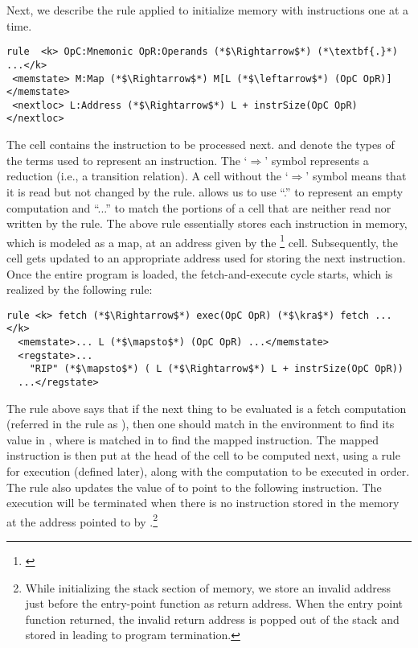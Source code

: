 Next, we describe the rule applied to initialize memory with instructions one at a time.
\begin{lstlisting}[style=KRULE]
rule  <k> OpC:Mnemonic OpR:Operands (*$\Rightarrow$*) (*\textbf{.}*) ...</k>
 <memstate> M:Map (*$\Rightarrow$*) M[L (*$\leftarrow$*) (OpC OpR)] </memstate>
 <nextloc> L:Address (*$\Rightarrow$*) L + instrSize(OpC OpR) </nextloc>
\end{lstlisting}
The  cell contains the instruction to be processed next.   and  denote the types of the terms used to represent an instruction.  The `$\Rightarrow$' symbol
represents a reduction (i.e., a transition relation). A cell without the `$\Rightarrow$' symbol means that it is read but not changed by the rule. \K allows us to use ``.'' to represent an empty computation and ``...'' to match the portions of a cell that are neither read nor written by the rule. The above rule essentially  stores each instruction in memory, which is modeled as a map, at an address  given by the %
\footnote{\label{nextloc}} cell. Subsequently,
the  cell gets updated to an appropriate address  used for storing the next instruction.  Once the entire program is loaded, the fetch-and-execute cycle starts, which is realized by the following rule:
\begin{lstlisting}[style=KRULE]
rule <k> fetch (*$\Rightarrow$*) exec(OpC OpR) (*$\kra$*) fetch ... </k>
  <memstate>... L (*$\mapsto$*) (OpC OpR) ...</memstate>
  <regstate>... 
    "RIP" (*$\mapsto$*) ( L (*$\Rightarrow$*) L + instrSize(OpC OpR))  
  ...</regstate>
\end{lstlisting}
%
 The rule above says that if the next thing to be evaluated is a fetch computation (referred in the rule as ), then one should match  in the environment to find its value 
 in , where  is matched in  to find the mapped instruction.
 The mapped instruction is then put at the head of the  cell to be computed next, using a rule  for execution (defined later), along with the  computation to be executed in order. The rule also updates the value of  to point to the following instruction. The execution will be terminated when there is no instruction stored in the memory at the address pointed to by .\footnote{While initializing the stack section of memory, we store an invalid address just before the entry-point function as return address. When the entry point function returned, the invalid return address is popped out of the stack and stored in  leading to program termination.} 


